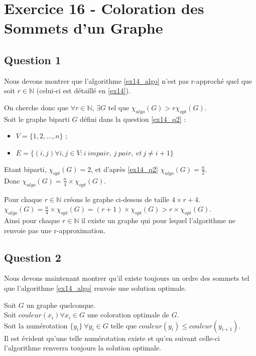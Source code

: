 
\section{Exercice 16 - Coloration des Sommets d'un Graphe}\label{ex16}

\subsection{Question 1}\label{ex16_q1}
Nous devons montrer que l'algorithme \ref{ex14_algo} n'est pas r-approch\'e quel que soit
$r \in \mathbb{N}$ (celui-ci est d\'etaill\'e en \ref{ex14}).

On cherche donc que $\forall r \in \mathbb{N}$, $\exists G$ tel que $\chi_{algo}(G) >
r\chi_{opt}(G)$.\\
Soit le graphe biparti $G$ d\'efini dans la question \ref{ex14_q2} :
\begin{itemize}
	\item $V = \{1,2,...,n\}$ ;
	\item $E = \{(i,j) \forall i,j \in V : i\ impair,\ j\ pair,\ et\ j \neq i+1\}$
\end{itemize}
Etant biparti, $\chi_{opt}(G) = 2$, et d'apr\`es \ref{ex14_q2} $\chi_{algo}(G) = \frac{n}{2}$.\\
Donc $\chi_{algo}(G) = \frac{n}{4} \times \chi_{opt}(G)$.

Pour chaque $r \in \mathbb{N}$ cr\'eons le graphe ci-dessus de taille $4 \times r + 4$.\\
$\chi_{algo}(G) = \frac{n}{4} \times \chi_{opt}(G) = (r + 1) \times \chi_{opt}(G) > r
\times \chi_{opt}(G)$.\\
Ainsi pour chaque $r \in \mathbb{N}$ il existe un graphe qui pour lequel l'algorithme ne renvoie
pas une r-approximation.

\subsection{Question 2}\label{ex16_q2}
Nous devons maintenant montrer qu'il existe toujours un ordre des sommets tel que
l'algorithme \ref{ex14_algo} renvoie une solution optimale.

Soit $G$ un graphe quelconque.\\
Soit $couleur(x_i) \forall x_i \in G$ une coloration optimale de $G$.\\
Soit la num\'erotation $\{y_i\}\ \forall y_i \in G$ telle que $couleur(y_i) \leq
couleur(y_{i+1})$.\\
Il est \'evident qu'une telle num\'erotation existe et qu'en suivant celle-ci
l'algorithme renverra toujours la solution optimale.

